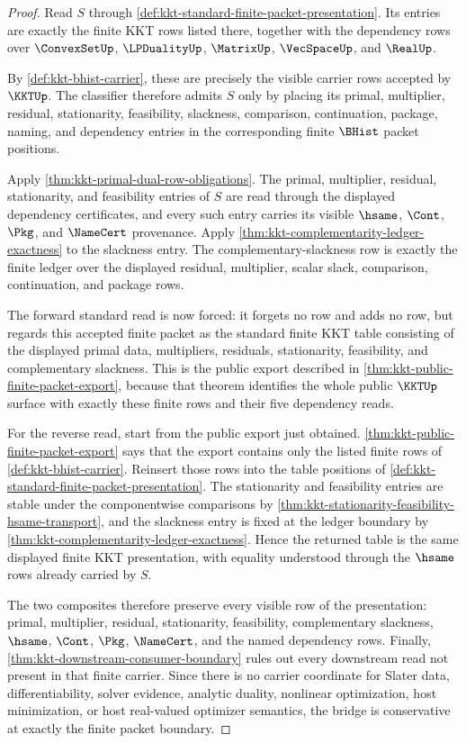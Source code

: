 \begin{proof}
Read $S$ through \autoref{def:kkt-standard-finite-packet-presentation}. Its entries are exactly the finite KKT rows listed there, together with the dependency rows over $\ConvexSetUp$, $\LPDualityUp$, $\MatrixUp$, $\VecSpaceUp$, and $\RealUp$.

By \autoref{def:kkt-bhist-carrier}, these are precisely the visible carrier rows accepted by $\KKTUp$. The classifier therefore admits $S$ only by placing its primal, multiplier, residual, stationarity, feasibility, slackness, comparison, continuation, package, naming, and dependency entries in the corresponding finite $\BHist$ packet positions.

Apply \autoref{thm:kkt-primal-dual-row-obligations}. The primal, multiplier, residual, stationarity, and feasibility entries of $S$ are read through the displayed dependency certificates, and every such entry carries its visible $\hsame$, $\Cont$, $\Pkg$, and $\NameCert$ provenance. Apply \autoref{thm:kkt-complementarity-ledger-exactness} to the slackness entry. The complementary-slackness row is exactly the finite ledger over the displayed residual, multiplier, scalar slack, comparison, continuation, and package rows.

The forward standard read is now forced: it forgets no row and adds no row, but regards this accepted finite packet as the standard finite KKT table consisting of the displayed primal data, multipliers, residuals, stationarity, feasibility, and complementary slackness. This is the public export described in \autoref{thm:kkt-public-finite-packet-export}, because that theorem identifies the whole public $\KKTUp$ surface with exactly these finite rows and their five dependency reads.

For the reverse read, start from the public export just obtained. \autoref{thm:kkt-public-finite-packet-export} says that the export contains only the listed finite rows of \autoref{def:kkt-bhist-carrier}. Reinsert those rows into the table positions of \autoref{def:kkt-standard-finite-packet-presentation}. The stationarity and feasibility entries are stable under the componentwise comparisons by \autoref{thm:kkt-stationarity-feasibility-hsame-transport}, and the slackness entry is fixed at the ledger boundary by \autoref{thm:kkt-complementarity-ledger-exactness}. Hence the returned table is the same displayed finite KKT presentation, with equality understood through the $\hsame$ rows already carried by $S$.

The two composites therefore preserve every visible row of the presentation: primal, multiplier, residual, stationarity, feasibility, complementary slackness, $\hsame$, $\Cont$, $\Pkg$, $\NameCert$, and the named dependency rows. Finally, \autoref{thm:kkt-downstream-consumer-boundary} rules out every downstream read not present in that finite carrier. Since there is no carrier coordinate for Slater data, differentiability, solver evidence, analytic duality, nonlinear optimization, host minimization, or host real-valued optimizer semantics, the bridge is conservative at exactly the finite packet boundary.
\end{proof}

